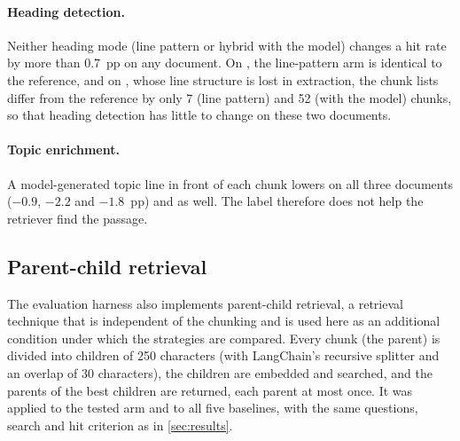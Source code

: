 \paragraph{Heading detection.} Neither heading mode (line pattern or hybrid with the
model) changes a hit rate by more than 0.7~pp on any document. On , the
line-pattern arm is identical to the reference, and on , whose line structure
is lost in extraction, the chunk lists differ from the reference by only 7 (line pattern)
and 52 (with the model) chunks, so that heading detection has little to change on these
two documents.

\paragraph{Topic enrichment.} A model-generated topic line in front of each chunk lowers
 on all three documents ($-0.9$, $-2.2$ and $-1.8$~pp) and  as well. The
label therefore does not help the retriever find the passage.

\subsection*{Parent-child retrieval}
\label{sec:parentchild}

The evaluation harness also implements parent-child retrieval, a retrieval technique that
is independent of the chunking and is used here as an additional condition under which the
strategies are compared. Every chunk (the parent) is divided into children of 250
characters (with LangChain's recursive splitter and an overlap of 30 characters), the
children are embedded and searched, and the parents of the best children are returned,
each parent at most once. It was applied to the tested arm and to all five baselines, with
the same questions, search and hit criterion as in \cref{sec:results}.

